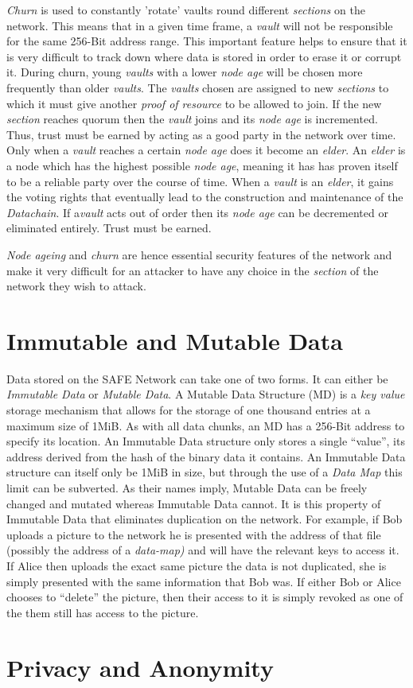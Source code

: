 \textit{Churn} is used to constantly 'rotate' vaults round different \textit{sections} on the network. This means that in a given time frame, a \textit{vault} will not be responsible for the same 256-Bit address range. This important feature helps to ensure that it is very difficult to track down where data is stored in order to erase it or corrupt it. During churn, young \textit{vaults} with a lower \textit{node age} will be chosen more frequently than older \textit{vaults}. The \textit{vaults} chosen are assigned to new \textit{sections} to which it must give another \textit{proof of resource} to be allowed to join. If the new \textit{section} reaches quorum then the \textit{vault} joins and its \textit{node age} is incremented. Thus, trust must be earned by acting as a good party in the network over time. Only when a \textit{vault} reaches a certain \textit{node age} does it become an \textit{elder}. An \textit{elder} is a node which has the highest possible \textit{node age}, meaning it has has proven itself to be a reliable party over the course of time. When a \textit{vault} is an \textit{elder}, it gains the voting rights that eventually lead to the construction and maintenance of the \textit{Datachain}. If a\textit{vault} acts out of order then its \textit{node age} can be decremented or eliminated entirely. Trust must be earned.

\textit{Node ageing} and \textit{churn} are hence essential security features of the network and make it very difficult for an attacker to have any choice in the \textit{section} of the network they wish to attack.

\section{Immutable and Mutable Data}

Data stored on the SAFE Network can take one of two forms. It can either be \textit{Immutable Data} or \textit{Mutable Data}. A Mutable Data Structure (MD) is a \textit{key value} storage mechanism that allows for the storage of one thousand entries at a maximum size of 1MiB. As with all data chunks, an MD has a 256-Bit address to specify its location. An Immutable Data structure only stores a single ``value'', its address derived from the hash of the binary data it contains. An Immutable Data structure can itself only be 1MiB in size, but through the use of a \textit{Data Map} this limit can be subverted. As their names imply, Mutable Data can be freely changed and mutated whereas Immutable Data cannot.  It is this property of Immutable Data that eliminates duplication on the network. For example, if Bob uploads a picture to the network he is presented with the address of that file (possibly the address of a \textit{data-map)} and will have the relevant keys to access it. If Alice then uploads the exact same picture the data is not duplicated, she is simply presented with the same information that Bob was. If either Bob or Alice chooses to ``delete'' the picture, then their access to it is simply revoked as one of the them still has access to the picture.

\section{Privacy and Anonymity}